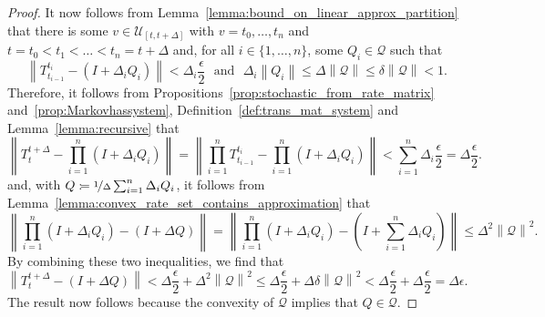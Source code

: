 \documentclass[10pt,a4paper]{paper}
\theoremstyle{definition}
\newcommand{\rateset}{\mathcal{Q}}
\newcommand{\norm}[1]{\left\lVert #1 \right\rVert}
\newcommand{\coloneqq}{:\!=}
\begin{document}
\begin{proof}
It now follows from Lemma~\ref{lemma:bound_on_linear_approx_partition} that there is some $v\in\mathcal{U}_{[t,t+\Delta]}$ with $v=t_0,\ldots,t_n$ and $t=t_0<t_1<\dots<t_n=t+\Delta$ and, for all $i\in\{1,\ldots,n\}$, some $Q_i\in\rateset$ such that
\begin{equation*}
\norm{T_{t_{i-1}}^{t_i} - (I+\Delta_iQ_i)} < \Delta_i\frac{\epsilon}{2}
\text{~~and~~}
\Delta_i\norm{Q_i}\leq \Delta\norm{\rateset}\leq \delta\norm{\rateset}<1.
\end{equation*}
Therefore, it follows from Propositions~\ref{prop:stochastic_from_rate_matrix} and~\ref{prop:Markovhassystem}, Definition~\ref{def:trans_mat_system} and Lemma~\ref{lemma:recursive} that
\begin{equation*}%
\norm{T_t^{t+\Delta} - \prod_{i=1}^n(I+\Delta_iQ_i)} = \norm{\prod_{i=1}^nT_{t_{i-1}}^{t_i} - \prod_{i=1}^n(I+\Delta_iQ_i)}
 < \sum_{i=1}^n\Delta_i\frac{\epsilon}{2} 
 = \Delta\frac{\epsilon}{2}.
\end{equation*}
and, with $Q\coloneqq\nicefrac{1}{\Delta}\sum_{i=1}^n \Delta_i Q_i$, it follows from Lemma~\ref{lemma:convex_rate_set_contains_approximation} that
\begin{equation*}%
\norm{\prod_{i=1}^n(I+\Delta_iQ_i)-(I+\Delta Q)}=
\norm{\prod_{i=1}^n(I+\Delta_iQ_i) - (I+\sum_{i=1}^n\Delta_i Q_i)} \leq \Delta^2\norm{\rateset}^2.
\end{equation*}
By combining these two inequalities, we find that
\begin{equation*}
\norm{T_t^{t+\Delta} - (I+\Delta Q)} %
<\Delta\frac{\epsilon}{2}+\Delta^2\norm{\rateset}^2
\leq\Delta\frac{\epsilon}{2}+\Delta\delta\norm{\rateset}^2
<\Delta\frac{\epsilon}{2}+\Delta\frac{\epsilon}{2}=\Delta\epsilon.
\end{equation*}
The result now follows because the convexity of $\rateset$ implies that $Q\in\rateset$.
\end{proof}
\end{document}
